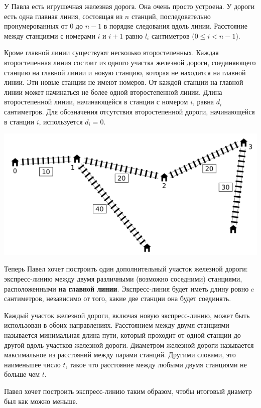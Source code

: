 У Павла есть игрушечная железная дорога. Она очень просто устроена. У дороги есть одна главная линия, состоящая из $n$ станций, последовательно
пронумерованных от $0$ до $n - 1$ в порядке следования вдоль линии. Расстояние между станциями с номерами $i$ и $i + 1$ равно $l_i$ сантиметров ($0 \leq i < n - 1$).

Кроме главной линии существуют несколько второстепенных. Каждая второстепенная линия состоит из одного участка железной дороги, соединяющего станцию на главной линии и новую станцию, которая не находится на главной линии. Эти новые станции не имеют номеров. От каждой станции на главной линии может начинаться не более одной второстепенной линии. Длина второстепенной линии, начинающейся в станции с номером $i$, равна $d_i$ сантиметров. Для обозначения отсутствия второстепенной дороги, начинающейся в станции $i$, используется $d_i = 0$.

\includegraphics[scale=0.9]{1.png}

Теперь Павел хочет построить один дополнительный участок железной дороги: экспресс-линию между двумя различными (возможно соседними) станциями, расположенными \textbf{на главной линии}. Экспресс-линия будет иметь длину ровно $c$ сантиметров, независимо от того, какие две станции она будет соединять.

Каждый участок железной дороги, включая новую экспресс-линию, может быть использован в обоих направлениях. Расстоянием между двумя станциями называется минимальная длина пути, который проходит от одной станции до другой вдоль участков железной дороги. Диаметром железной дороги называется максимальное из расстояний между парами станций. Другими словами, это наименьшее число $t$, такое что расстояние между любыми двумя станциями не больше чем $t$.

Павел хочет построить экспресс-линию таким образом, чтобы итоговый диаметр был как можно меньше.

